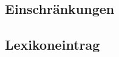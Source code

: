 \documentclass[12pt,a4paper]{article}
\begin{document}
\subsection{Einschränkungen}

	

\subsection{Lexikoneintrag}
\end{document}
